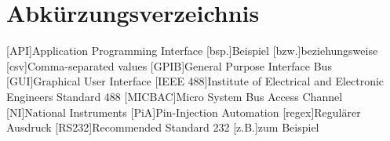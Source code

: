 \section*{Abkürzungsverzeichnis}
\begin{acronym}[MICBAC]
[API]{Application Programming Interface}
[bsp.]{Beispiel}
[bzw.]{beziehungsweise}
[csv]{Comma-separated values}
[GPIB]{General Purpose Interface Bus}
[GUI]{Graphical User Interface}
[IEEE 488]{Institute of Electrical and Electronic Engineers Standard 488}
[MICBAC]{Micro System Bus Access Channel}
[NI]{National Instruments}
[PiA]{Pin-Injection Automation}
[regex]{Regulärer Ausdruck}
[RS232]{Recommended Standard 232}
[z.B.]{zum Beispiel}
\end{acronym}